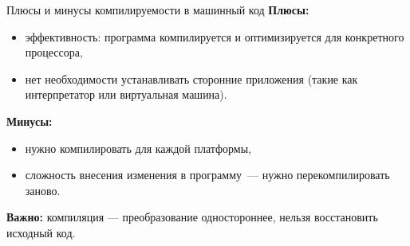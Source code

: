 \documentclass[aspectration=1610,t]{beamer}
\begin{document}
%
%
%

\begin{frame}[fragile]{Плюсы и минусы компилируемости в машинный код}{}
    {\bf Плюсы:}
    \begin{itemize}
        \item эффективность: программа компилируется и оптимизируется для
            конкретного процессора,
        \item нет необходимости устанавливать сторонние приложения (такие как
            интерпретатор или виртуальная машина).
    \end{itemize}

    {\bf Минусы:}
    \begin{itemize}
        \item нужно компилировать для каждой платформы,
        \item сложность внесения изменения в программу~--- 
            нужно перекомпилировать заново.
    \end{itemize}

    {\bf Важно:} компиляция — преобразование одностороннее, нельзя восстановить исходный код.
\end{frame}
\end{document}
